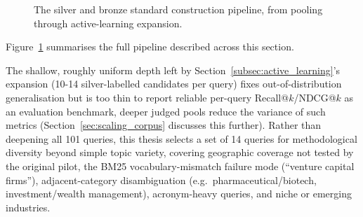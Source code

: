 \documentclass[a4paper,oneside,bibliography=totoc]{scrbook}
\begin{document}
\begin{figure}[!htb]
{%
}
\caption{The silver and bronze standard construction pipeline, from pooling through active-learning expansion.}
\label{fig:gold_silver_pipeline}
\end{figure}

Figure~\ref{fig:gold_silver_pipeline} summarises the full pipeline described across this section.

\label{subsec:headline_deepening}

The shallow, roughly uniform depth left by Section~\ref{subsec:active_learning}'s expansion (10-14 silver-labelled candidates per query) fixes out-of-distribution generalisation but is too thin to report reliable per-query Recall@$k$/NDCG@$k$ as an evaluation benchmark, deeper judged pools reduce the variance of such metrics (Section~\ref{sec:scaling_corpus} discusses this further). Rather than deepening all 101 queries, this thesis selects a set of 14 queries for methodological diversity beyond simple topic variety, covering geographic coverage not tested by the original pilot, the BM25 vocabulary-mismatch failure mode (``venture capital firms''), adjacent-category disambiguation (e.g.\ pharmaceutical/biotech, investment/wealth management), acronym-heavy queries, and niche or emerging industries.
\end{document}
